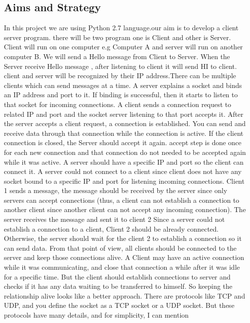 \documentclass[11pt,a4paper]{article}
\begin{document}
\subsection{Aims and Strategy}
In this project we are using Python 2.7 language.our aim is to develop a
client server program. there will be two program one is Client and other is
Server. Client will run on one computer e.g Computer A and server will run
on another computer B. We will send a Hello message from Client to Server.
When the Server receive Hello message , after listening to client it will send
HI to client. client and server will be recognized by their IP address.There
can be multiple clients which can send messages at a time. A server explains
a socket and binds an IP address and port to it. If binding is successful, then
it starts to listen to that socket for incoming connections. A client sends a
connection request to related IP and port and the socket server listening to
that port accepts it. After the server accepts a client request, a connection
is established. You can send and receive data through that connection while
the connection is active. If the client connection is closed, the Server should
accept it again. accept step is done once for each new connection and that
connection do not needed to be accepted again while it was active. A server
should have a specific IP and port so the client can connect it. A server could
not connect to a client since client does not have any socket bound to a specific
IP and port for listening incoming connections. Client 1 sends a message,
the message should be received by the server since only servers can accept
connections (thus, a client can not establish a connection to another client
since another client can not accept any incoming connection). The server
receives the message and sent it to client 2 Since a server could not establish
a connection to a client, Client 2 should be already connected. Otherwise,
the server should wait for the client 2 to establish a connection so it can send
data. From that point of view, all clients should be connected to the server
and keep those connections alive. A Client may have an active connection
while it was communicating, and close that connection a while after it was
idle for a specific time. But the client should establish connections to server
and checks if it has any data waiting to be transferred to himself. So keeping
the relationship alive looks like a better approach. There are protocols like
TCP and UDP, and you define the socket as a TCP socket or a UDP socket.
But these protocols have many details, and for simplicity, I can mention
\end{document}
